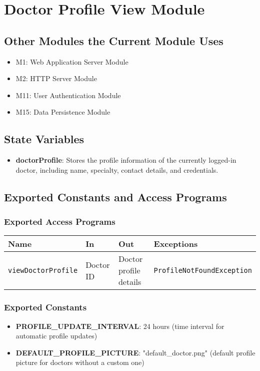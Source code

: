 \documentclass[12pt, titlepage]{article}
\begin{document}
\section{Doctor Profile View Module}

\subsection{Other Modules the Current Module Uses}
\begin{itemize}
    \item M1: Web Application Server Module
    \item M2: HTTP Server Module
    \item M11: User Authentication Module
    \item M15: Data Persistence Module
\end{itemize}

\subsection{State Variables}
\begin{itemize}
    \item \textbf{doctorProfile}: Stores the profile information of the currently logged-in doctor, including name, specialty, contact details, and credentials.
\end{itemize}

\subsection{Exported Constants and Access Programs}
\subsubsection{Exported Access Programs}
\begin{tabular}{|l|l|l|l|}
    \hline
    \textbf{Name} & \textbf{In} & \textbf{Out} & \textbf{Exceptions} \\
    \hline 
    \texttt{viewDoctorProfile} & Doctor ID & Doctor profile details & \texttt{ProfileNotFoundException} \\
    \hline
\end{tabular}

\subsubsection{Exported Constants}
\begin{itemize}
\item \textbf{PROFILE\_UPDATE\_INTERVAL}: 24 hours (time interval for automatic profile updates)
\item \textbf{DEFAULT\_PROFILE\_PICTURE}: "default\_doctor.png" (default profile picture for doctors without a custom one)
\end{itemize}
\end{document}
